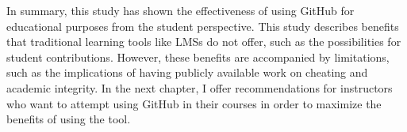 In summary, this study has shown the effectiveness of using GitHub for educational purposes from the student perspective. This study describes benefits that traditional learning tools like LMSs do not offer, such as the possibilities for student contributions. However, these benefits are accompanied by limitations, such as the implications of having publicly available work on cheating and academic integrity. In the next chapter, I offer recommendations for instructors who want to attempt using GitHub in their courses in order to maximize the benefits of using the tool.
